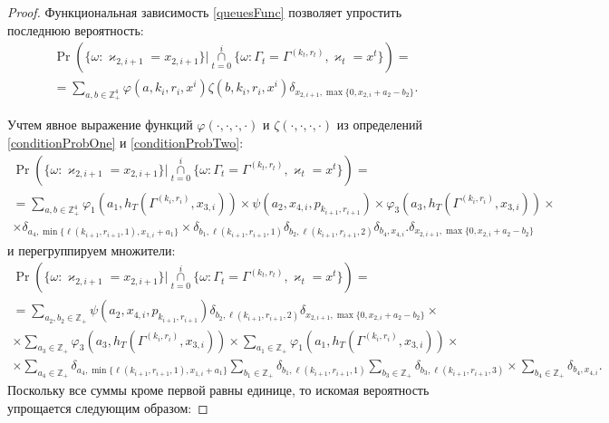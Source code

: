 \documentclass{report}
\begin{document}
\begin{proof}
Функциональная зависимость \eqref{queuesFunc} позволяет упростить последнюю вероятность:
\begin{multline*}
\Pr (\{ \omega \colon \varkappa_{2,i+1} = x_{2,i+1}\} |\mathop{\cap}\limits_{t=0}^{i}\{\omega\colon \Gamma_t=\Gamma^{(k_t,r_t)}, \varkappa_t=x^t\}) =\\
=\sum_{a,b\in \mathbb{Z}_+^4} \varphi(a,k_i,r_i,x^i)\zeta(b,k_i,r_i,x^i)  \delta_{x_{2,i+1},\max\{0,x_{2,i}+a_2-b_2\}}.
\end{multline*}

Учтем явное выражение функций $\varphi(\cdot, \cdot, \cdot, \cdot)$ и $\zeta(\cdot, \cdot, \cdot, \cdot)$ из определений \eqref{conditionProbOne} и \eqref{conditionProbTwo}:
\begin{multline*}
\Pr (\{ \omega \colon \varkappa_{2,i+1} = x_{2,i+1}\} |\mathop{\cap}\limits_{t=0}^{i}\{\omega\colon \Gamma_t=\Gamma^{(k_t,r_t)}, \varkappa_t=x^t\}) =\\
=  \sum_{a,b\in \mathbb{Z}_+^4} \varphi_1(a_1,h_T(\Gamma^{(k_i,r_i)},x_{3,i})) \times \psi(a_2,x_{4,i}, p_{k_{i+1},r_{i+1}})  \times \varphi_3(a_3,h_T(\Gamma^{(k_i,r_i)},x_{3,i})) \times \\ \times \delta_{a_4,\min{\{\ell(k_{i+1},r_{i+1},1), x_{1,i}+a_1}\}} \times \delta_{b_1,\ell(k_{i+1},r_{i+1},1)} \delta_{b_2,\ell(k_{i+1},r_{i+1},2)} 
\delta_{b_4,x_{4,i}}. \delta_{x_{2,i+1},\max\{0,x_{2,i}+a_2-b_2\}} 
\end{multline*}
и перегруппируем множители:
\begin{multline*}
\Pr (\{ \omega \colon \varkappa_{2,i+1} = x_{2,i+1}\} |\mathop{\cap}\limits_{t=0}^{i}\{\omega\colon \Gamma_t=\Gamma^{(k_t,r_t)}, \varkappa_t=x^t\}) =\\
= \sum_{a_2,b_2\in \mathbb{Z}_+}\psi(a_2,x_{4,i}, p_{k_{i+1},r_{i+1}})  \delta_{b_2,\ell(k_{i+1},r_{i+1},2)}   \delta_{x_{2,i+1},\max\{0,x_{2,i}+a_2-b_2\}} \times \\ 
\times \sum_{a_3\in \mathbb{Z}_+} \varphi_3(a_3,h_T(\Gamma^{(k_i,r_i)},x_{3,i})) \times \sum_{a_1\in \mathbb{Z}_+} \varphi_1(a_1,h_T(\Gamma^{(k_i,r_i)},x_{3,i})) \times \\ 
\times \sum_{a_4\in \mathbb{Z}_+} \delta_{a_4,\min{\{\ell(k_{i+1},r_{i+1},1), x_{1,i}+a_1}\}} \sum_{b_1\in \mathbb{Z}_+} \delta_{b_1,\ell(k_{i+1},r_{i+1},1)} \sum_{b_3\in \mathbb{Z}_+} \delta_{b_3,\ell(k_{i+1},r_{i+1},3)} 
\times \sum_{b_4\in \mathbb{Z}_+}  \delta_{b_4,x_{4,i}}.
\end{multline*}
Поскольку все суммы кроме первой равны единице, то искомая вероятность упрощается следующим образом:

\end{proof}
\end{document}
